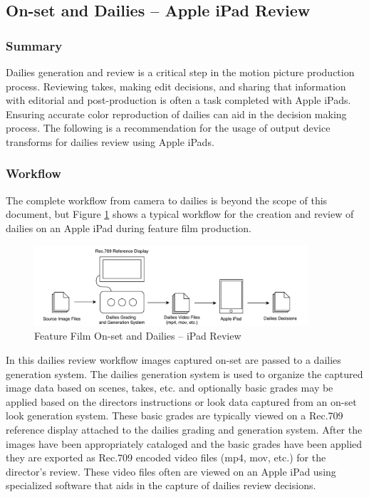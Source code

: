 \subsection{On-set and Dailies -- Apple iPad Review} \label{subsec:ff-onset-dailies-ipad}

	\subsubsection{Summary}
	
	Dailies generation and review is a critical step in the motion picture production process.  Reviewing takes, making edit decisions, and sharing that information with editorial and post-production is often a task completed with Apple iPads.  Ensuring accurate color reproduction of dailies can aid in the decision making process. The following is a recommendation for the usage of output device transforms for dailies review using Apple iPads.
	
	\subsubsection{Workflow}
	
	The complete workflow from camera to dailies is beyond the scope of this document, but Figure \ref{fig:workflow3} shows a typical workflow for the creation and review of dailies on an Apple iPad during feature film production.
	
	\begin{figure}[ht!]
	\centering
	    \includegraphics[width=4in]{images/workflows/workflow_ff-onset-dailies-ipad.pdf}
	    \caption{\small Feature Film On-set and Dailies -- iPad Review}
	    \label{fig:workflow3}
	\end{figure}
	
	In this dailies review workflow images captured on-set are passed to a dailies generation system.  The dailies generation system is used to organize the captured image data based on scenes, takes, etc. and optionally basic grades may be applied based on the directors instructions or look data captured from an on-set look generation system. These basic grades are typically viewed on a Rec.709 reference display attached to the dailies grading and generation system.  After the images have been appropriately cataloged and the basic grades have been applied they are exported as Rec.709 encoded video files (mp4, mov, etc.) for the director's review.  These video files often are viewed on an Apple iPad using specialized software that aids in the capture of dailies review decisions.
	
